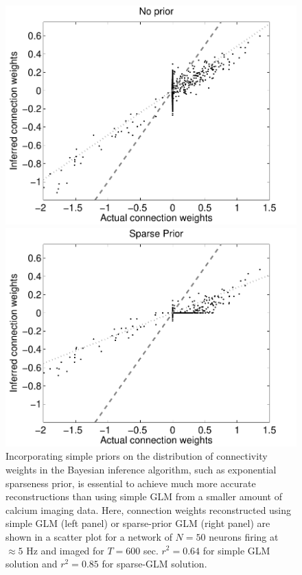 \begin{figure}[h]
\centering
\begin{minipage}[c]{0.45\hsize}
\includegraphics[width=\hsize]{../figs/FigureA10_regular_sol}
\end{minipage}
\begin{minipage}[c]{0.45\hsize}
\includegraphics[width=\hsize]{../figs/FigureA10_sparse_sol}
\end{minipage}
\caption{Incorporating simple priors on the distribution of connectivity weights in the Bayesian inference algorithm, such as exponential sparseness prior, is essential to achieve much more accurate reconstructions than using simple GLM from a smaller amount of calcium imaging data. Here, connection weights reconstructed using simple GLM (left panel) or sparse-prior GLM (right panel) are shown in a scatter plot for a network of $N=50$ neurons firing at $\approx 5$ Hz and imaged for $T=600$ sec. $r^2=0.64$ for simple GLM solution and $r^2=0.85$ for sparse-GLM solution.}
\label{fig:sparse}
\end{figure}

